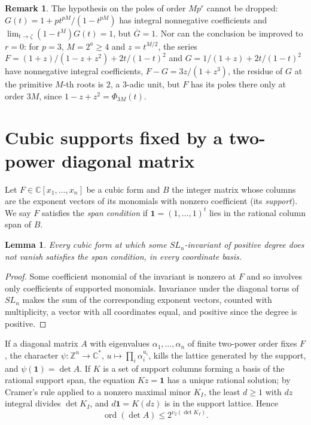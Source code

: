 \documentclass[11pt,a4paper]{article}
\newtheorem{lemma}[theorem]{Lemma}
\theoremstyle{definition}
\newtheorem{remark}[theorem]{Remark}
\newcommand{\C}{\mathbb{C}}
\newcommand{\Z}{\mathbb{Z}}
\newcommand{\one}{\mathbf{1}}
\newcommand{\ord}{\operatorname{ord}}
\begin{document}
\begin{remark}
The hypothesis on the poles of order $Mp^r$ cannot be dropped: $G(t)=1+pt^{pM}/
(1-t^{pM})$ has integral nonnegative coefficients and $\lim_{t\to\zeta}
(1-t^M)G(t)=1$, but $\overline G=1$. Nor can the conclusion be improved to
$r=0$: for $p=3$, $M=2^a\ge4$ and $z=t^{M/2}$, the series
$F=(1+z)/(1-z+z^2)+2t/(1-t)^2$ and $G=1/(1+z)+2t/(1-t)^2$ have nonnegative
integral coefficients, $F-G=3z/(1+z^3)$, the residue of $G$ at the primitive
$M$-th roots is $2$, a $3$-adic unit, but $F$ has its poles there only at order
$3M$, since $1-z+z^2=\Phi_{3M}(t)$.
\end{remark}

\section{Cubic supports fixed by a two-power diagonal matrix}\label{sec:support}

Let $F\in\C[x_1,\dots,x_n]$ be a cubic form and $B$ the integer matrix whose
columns are the exponent vectors of its monomials with nonzero coefficient
(its \emph{support}). We say $F$ satisfies the \emph{span condition} if
$\one=(1,\dots,1)^t$ lies in the rational column span of $B$.

\begin{lemma}\label{lem:span}
Every cubic form at which some $SL_n$-invariant of positive degree does not
vanish satisfies the span condition, in every coordinate basis.
\end{lemma}

\begin{proof}
Some coefficient monomial of the invariant is nonzero at $F$ and so involves
only coefficients of supported monomials. Invariance under the diagonal torus
of $SL_n$ makes the sum of the corresponding exponent vectors, counted with
multiplicity, a vector with all coordinates equal, and positive since the
degree is positive.
\end{proof}

If a diagonal matrix $A$ with eigenvalues $\alpha_1,\dots,\alpha_n$ of finite
two-power order fixes $F$, the character $\psi:\Z^n\to\C^*$,
$u\mapsto\prod_i\alpha_i^{u_i}$, kills the lattice generated by the support,
and $\psi(\one)=\det A$. If $K$ is a set of support columns forming a basis of
the rational support span, the equation $Kz=\one$ has a unique rational
solution; by Cramer's rule applied to a nonzero maximal minor $K_I$, the least
$d\ge1$ with $dz$ integral divides $\det K_I$, and $d\one=K(dz)$ is in the
support lattice. Hence
\begin{equation}\label{eq:cramer}
 \ord(\det A)\le2^{v_2(\det K_I)} .
\end{equation}
\end{document}
